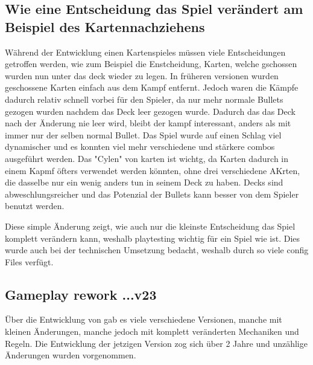 




%


\subsection{Wie eine Entscheidung das Spiel verändert am Beispiel des Kartennachziehens}\label{subsec:placementMatters}

Während der Entwicklung einen Kartenspieles müssen viele Entscheidungen getroffen werden, wie zum Beispiel die Enstcheidung,
Karten, welche gschossen wurden nun unter das deck wieder zu legen. In früheren \FF versionen wurden geschossene Karten einfach aus dem Kampf entfernt.
Jedoch waren die Kämpfe dadurch relativ schnell vorbei für den Spieler, da nur mehr normale Bullets gezogen wurden nachdem das Deck leer gezogen wurde.
Dadurch das das Deck nach der Änderung nie leer wird, bleibt der kampf interessant, anders als mit immer nur der selben normal Bullet.
Das Spiel wurde auf einen Schlag viel dynamischer und es konnten viel mehr verschiedene und stärkere combos ausgeführt werden. Das "Cylen"
von karten ist wichtg, da Karten dadurch in einem Kapmf öfters verwendet werden könnten, ohne drei verschiedene AKrten,
die dasselbe nur ein wenig anders tun in seinem Deck zu haben. Decks sind abweschlungsreicher und das Potenzial der Bullets
kann besser von dem Spieler benutzt werden.


Diese simple Änderung zeigt, wie auch nur die kleinste Entscheidung das Spiel komplett verändern kann, weshalb playtesting
wichtig für ein Spiel wie \FF ist. Dies wurde auch bei der technischen Umsetzung bedacht, weshalb \FF durch so viele config Files verfügt.


\subsection{Gameplay rework ...v23}\label{subsec:placementMatters}
Über die Entwicklung von \FF gab es viele verschiedene Versionen, manche mit kleinen Änderungen, manche jedoch mit komplett veränderten Mechaniken und Regeln.
Die Entwicklung der jetzigen Version zog sich über 2 Jahre und unzählige Änderungen wurden vorgenommen.


